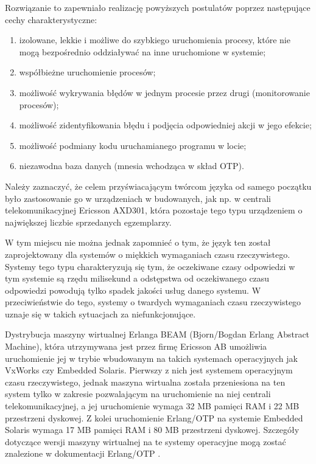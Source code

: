 Rozwiązanie to zapewniało realizację powyższych postulatów poprzez następujące cechy charakterystyczne:
\begin{enumerate}
\item izolowane, lekkie i możliwe do szybkiego uruchomienia procesy, które nie mogą bezpośrednio oddziaływać na inne uruchomione w systemie;
\item współbieżne uruchomienie procesów;
\item możliwość wykrywania błędów w jednym procesie przez drugi (monitorowanie procesów);
\item możliwość zidentyfikowania błędu i podjęcia odpowiedniej akcji w jego efekcie;
\item możliwość podmiany kodu uruchamianego programu w locie;
\item niezawodna baza danych (mnesia wchodząca w skład OTP).
\end{enumerate}

Należy zaznaczyć, że celem przyświacającym twórcom języka od samego początku było zastosowanie go w urządzeniach w budowanych, jak np. w centrali telekomunikacyjnej Ericsson AXD301, która pozostaje tego typu urządzeniem o największej liczbie sprzedanych egzemplarzy.

W tym miejscu nie można jednak zapomnieć o tym, że język ten został zaprojektowany dla systemów o miękkich wymaganiach czasu rzeczywistego. Systemy tego typu charakteryzują się tym, że oczekiwane czasy odpowiedzi w tym systemie są rzędu milisekund a odstępstwa od oczekiwanego czasu odpowiedzi powodują tylko spadek jakości usług danego systemu. W przeciwieństwie do tego, systemy o twardych wymaganiach czasu rzeczywistego uznaje się w takich sytuacjach za niefunkcjonujące.


Dystrybucja maszyny wirtualnej Erlanga BEAM (Bjorn/Bogdan Erlang Abstract Machine), która utrzymywana jest przez firmę Ericsson AB umożliwia uruchomienie jej w trybie wbudowanym na takich systemach operacyjnych jak VxWorks czy Embedded Solaris. Pierwszy z nich jest systemem operacyjnym czasu rzeczywistego, jednak maszyna wirtualna została przeniesiona na ten system tylko w zakresie pozwalającym na uruchomienie na niej centrali telekomunikacyjnej, a jej uruchomienie wymaga 32 MB pamięci RAM i 22 MB przestrzeni dyskowej.
Z kolei uruchomienie Erlang/OTP na systemie Embedded Solaris wymaga 17 MB pamięci RAM i 80 MB przestrzeni dyskowej.
Szczegóły dotyczące wersji maszyny wirtualnej na te systemy operacyjne mogą zostać znalezione w dokumentacji Erlang/OTP \cite{ErlangVxWorks}.


